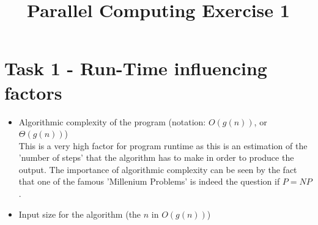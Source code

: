 \documentclass[10pt,a4paper]{article}
\title{Parallel Computing Exercise 1}
\date{}
\begin{document}
\maketitle

\section{Task 1 - Run-Time influencing factors}
\begin{itemize}
\item Algorithmic complexity of the program (notation: $O(g(n))$, or $\Theta(g(n))$)\\
This is a very high factor for program runtime as this is an estimation of the 'number of steps' that the algorithm has to make in order to produce the output. The importance of algorithmic complexity can be seen by the fact that one of the famous 'Millenium Problems' is indeed the question if $P=NP$.
\item Input size for the algorithm (the $n$ in $O(g(n))$)\\

\end{itemize}
\end{document}
